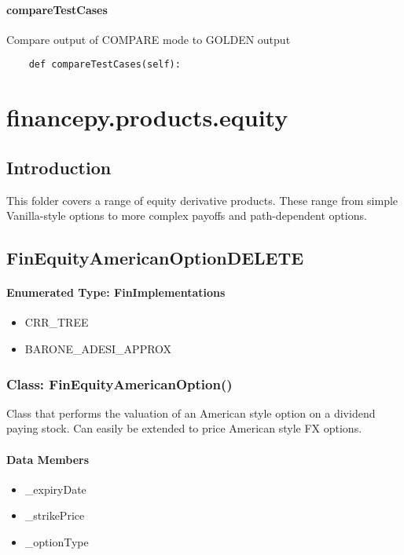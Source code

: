 \documentclass[twoside,11pt]{book}
\begin{document}
\subsubsection*{{\bf compareTestCases}}
Compare output of COMPARE mode to GOLDEN output  

\begin{lstlisting}
    def compareTestCases(self):
\end{lstlisting}


\chapter{financepy.products.equity}
\section{Introduction}

This folder covers a range of equity derivative products. These range from simple Vanilla-style options to more complex payoffs and path-dependent options. \newpage
\section{FinEquityAmericanOptionDELETE}

\subsubsection{Enumerated Type: FinImplementations}
\begin{itemize}
\item{CRR\_TREE}
\item{BARONE\_ADESI\_APPROX}
\end{itemize}

\subsection*{Class: FinEquityAmericanOption()}
Class that performs the valuation of an American style option on a dividend paying stock. Can easily be extended to price American style FX options.  

\subsubsection*{Data Members}
\begin{itemize}
\item{\_expiryDate}
\item{\_strikePrice}
\item{\_optionType}
\end{itemize}
\end{document}
